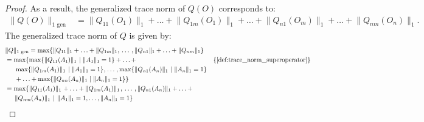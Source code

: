 \begin{proof}
As a result, the generalized trace norm of $Q(O)$ corresponds to:
\begin{equation} \label{eq:qo}
  \begin{split}
  \lVert Q(O)  \rVert_{1 \text{ gen}} & = \lVert Q_{11} (O_{1}) \rVert_{1} + \ldots + \lVert Q_{1m} (O_{1}) \rVert_{1} + \ldots +  \lVert Q_{n1} (O_{m})  \rVert_{1} +  \ldots +  \lVert Q_{nm} (O_{n}) \rVert_{1}. 
  \end{split}
\end {equation}
The generalized trace norm of $Q$ is given by:
\begin{equation}
  \begin{split} \label{eq:q}
  &\lVert Q  \rVert_{1 \text{ gen}} = \max \{ \lVert Q_{11} \rVert_{1} + \ldots + \lVert Q_{1m} \rVert_{1}, \hspace{2pt} \ldots \hspace{2pt}, \lVert Q_{n1} \rVert_{1} + \ldots + \lVert Q_{nm} \rVert_{1} \} \\
 & = \max \{ \max \{ \lVert Q_{11} (A_{1}) \rVert_{1} \hspace{1pt}  \mid   \lVert A_{1} \rVert_{1} = 1 \} + \ldots + &  \{\text{\autoref{def:trace_norm_superoperator}}\} \\
 & \hspace{15pt}  \max \{  \lVert Q_{1m} (A_{1}) \rVert_{1} \hspace{1pt}  \mid   \lVert A_{1} \rVert_{1} = 1 \} , \hspace{1pt} \ldots \hspace{1pt}, \max \{ \lVert Q_{n1} (A_{n}) \rVert_{1} \hspace{1pt}  \mid   \lVert A_{n} \rVert_{1} = 1 \}   \\
 &\hspace{15pt} + \ldots +  \max \{ \lVert Q_{nn} (A_{n}) \rVert_{1}   \mid \lVert A_{n} \rVert_{1} = 1 \}\}\\
 & = \max \{ \lVert Q_{11} (A_{1}) \rVert_{1} \hspace{1pt}  + \ldots +  \lVert Q_{1m} (A_{1}) \rVert_{1} \hspace{1pt} , \hspace{2pt} \ldots \hspace{2pt}, \lVert Q_{n1} (A_{n}) \rVert_{1}  + \ldots +  \\
 & \hspace{15pt} \lVert Q_{nm} (A_{n}) \rVert_{1} \hspace{1pt}  \mid \hspace{1pt}   \lVert A_{1} \rVert_{1} = 1, \ldots, \lVert A_{n} \rVert_{1} = 1 \}
  \end{split}
\end{equation}



\end{proof}
